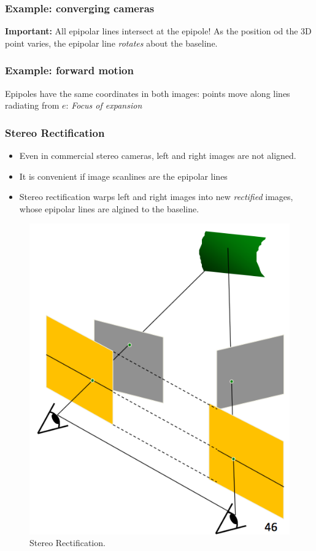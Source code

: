 \documentclass[a4paper,12 pt]{article}
\theoremstyle{definition}
\theoremstyle{remark}
\theoremstyle{definition}
\theoremstyle{definition}
\theoremstyle{definition}
\theoremstyle{remark}
\theoremstyle{definition}
\begin{document}
\subsubsection*{Example: converging cameras}
\textbf{Important:} All epipolar lines intersect at the epipole! As the position od the 3D point varies, the epipolar line \textit{rotates} about the baseline. 
\subsubsection*{Example: forward motion}
Epipoles have the same coordinates in both images: points move along lines radiating from $e$: \textit{Focus of expansion}
\subsubsection*{Stereo Rectification}
\begin{itemize}
\item Even in commercial stereo cameras, left and right images are not aligned.
\item It is convenient if image scanlines are the epipolar lines
\item Stereo rectification warps left and right images into new \textit{rectified} images, whose epipolar lines are algined to the baseline.
\end{itemize}
\begin{figure}[tbh]
\begin{center}
\includegraphics[scale=0.3]{pics/rectif}
\caption{Stereo Rectification. \label{fig:rectif}}
\end{center}
\end{figure}
\end{document}
